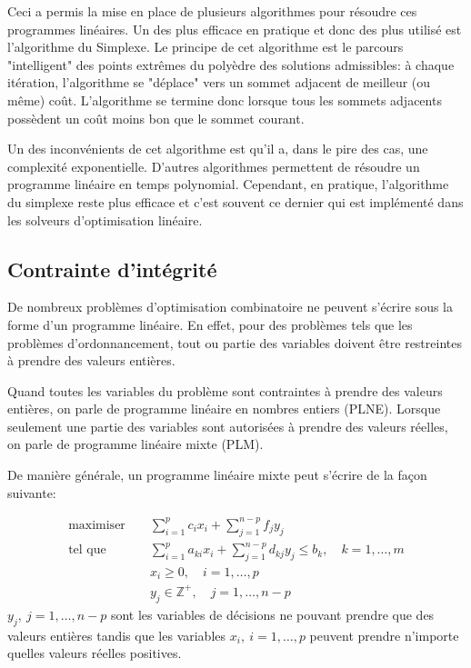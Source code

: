 Ceci a permis la mise en place de plusieurs algorithmes pour résoudre ces
programmes linéaires. Un des plus efficace en pratique et donc des plus
utilisé est l'algorithme du Simplexe. Le principe de cet 
algorithme est le parcours "intelligent" des points extrêmes du
polyèdre des solutions admissibles: à chaque itération,
l'algorithme se "déplace" vers un sommet adjacent de meilleur (ou
même) coût. L'algorithme se termine donc lorsque tous les sommets
adjacents possèdent un coût moins bon que le sommet courant.

Un des inconvénients de cet algorithme est qu'il a, dans le pire des
cas, une complexité exponentielle. D'autres algorithmes permettent de
résoudre un programme linéaire en temps polynomial. Cependant, en
pratique, l'algorithme du simplexe reste plus efficace et c'est
souvent ce dernier qui est implémenté dans les solveurs d'optimisation
linéaire. 

\subsection{Contrainte d'intégrité}

De nombreux problèmes d'optimisation combinatoire ne peuvent s'écrire
sous la forme d'un programme linéaire. En effet, pour des problèmes
tels que les problèmes d'ordonnancement, tout ou partie des
variables doivent être restreintes à prendre des valeurs entières.  

Quand toutes les variables du problème sont contraintes à prendre des
valeurs entières, on parle de programme linéaire en nombres
entiers (PLNE). Lorsque seulement une partie des variables sont
autorisées à prendre des valeurs réelles, on parle de programme
linéaire mixte (PLM). 

De manière générale, un programme linéaire mixte 
peut s'écrire de la façon suivante: 

\[ \begin{array}{lcl}
\text{maximiser } & & \displaystyle \sum_{i=1}^p c_ix_i +
\sum_{j=1}^{n-p} f_jy_j\\ \text{tel que }& & \displaystyle
\sum_{i=1}^p a_{ki}x_i + \sum_{j=1}^{n-p} d_{kj}y_j \le b_k, \quad
k=1,\dots,m\\ & & \displaystyle x_i \ge0,\quad i=1,\dots,p\\ & &
\displaystyle y_j \in \mathbb{Z}^+,\quad j=1,\dots,n-p 
\end{array}
\] $y_j,\ j=1,\dots,n-p$ sont les variables de décisions ne
pouvant prendre que des valeurs entières tandis que les variables
$x_i,\ i=1,\dots,p$ peuvent prendre n'importe quelles valeurs
réelles positives.

